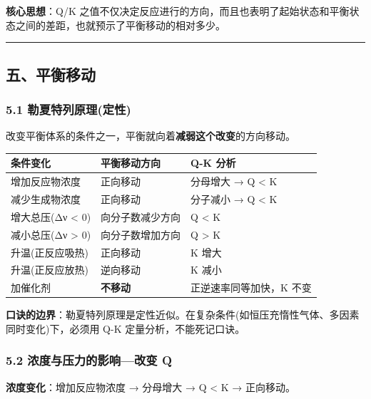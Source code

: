 \textbf{核心思想}：Q/K 之值不仅决定反应进行的方向，而且也表明了起始状态和平衡状态之间的差距，也就预示了平衡移动的相对多少。

\begin{center}\rule{0.5\linewidth}{0.5pt}\end{center}

\subsection{五、平衡移动}\label{ux4e94ux5e73ux8861ux79fbux52a8}

\subsubsection{5.1 勒夏特列原理(定性)}\label{ux52d2ux590fux7279ux5217ux539fux7406ux5b9aux6027}

改变平衡体系的条件之一，平衡就向着\textbf{减弱这个改变}的方向移动。

{\def\LTcaptype{none} %
\begin{longtable}[]{@{}lll@{}}
\toprule\noalign{}
条件变化 & 平衡移动方向 & Q-K 分析 \\
\midrule\noalign{}
\endhead
\bottomrule\noalign{}
\endlastfoot
增加反应物浓度 & 正向移动 & 分母增大 → Q \textless{} K \\
减少生成物浓度 & 正向移动 & 分子减小 → Q \textless{} K \\
增大总压(Δν \textless{} 0) & 向分子数减少方向 & Q \textless{} K \\
减小总压(Δν \textgreater{} 0) & 向分子数增加方向 & Q \textgreater{} K \\
升温(正反应吸热) & 正向移动 & K 增大 \\
升温(正反应放热) & 逆向移动 & K 减小 \\
加催化剂 & \textbf{不移动} & 正逆速率同等加快，K 不变 \\
\end{longtable}
}

\textbf{口诀的边界}：勒夏特列原理是定性近似。在复杂条件(如恒压充惰性气体、多因素同时变化)下，必须用 Q-K 定量分析，不能死记口诀。

\subsubsection{5.2 浓度与压力的影响---改变 Q}\label{ux6d53ux5ea6ux4e0eux538bux529bux7684ux5f71ux54cdux6539ux53d8-q}

\textbf{浓度变化}：增加反应物浓度 → 分母增大 → Q \textless{} K → 正向移动。

